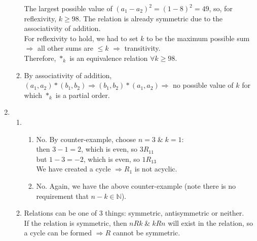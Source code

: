 \documentclass[a4paper, 12pt]{article}
\begin{document}
\begin{enumerate}
\begin{enumerate}
        \noindent The largest possible value of $(a_1 - a_2)^2 = (1 - 8)^2 = 49$, so, for reflexivity, $k \geq 98$. The relation is already symmetric due to the associativity of addition. \\

        \noindent For reflexivity to hold, we had to set $k$ to be the maximum possible sum $\Rightarrow$ all other sums are $\leq k$ $\Rightarrow$ transitivity. \\

        \noindent Therefore, $*_k$ is an equivalence relation $\forall k \geq 98$. \\

        \item By associativity of addition, $(a_1, a_2) * (b_1,b_2) \Rightarrow (b_1, b_2) * (a_1, a_2) \Rightarrow $ no possible value of $k$ for which $*_k$ is a partial order. \\ 
    \end{enumerate}

    \item \begin{enumerate}
        \item \begin{enumerate}
            \item No. By counter-example, choose $n = 3 \;\&\; k = 1$: \\
                then $3 - 1 = 2$, which is even, so $3R_11$ \\
                but $1 - 3 = -2$, which is even, so $1R_13$ \\
            
            \noindent We have created a cycle $\Rightarrow R_1$ is not acyclic. \\

            \item No. Again, we have the above counter-example (note there is no requirement that $n-k \in \mathbb{N}$). \\
        \end{enumerate}
        
        \item Relations can be one of 3 things: symmetric, antisymmetric or neither. \\
        
        \noindent If the relation is symmetric, then $nRk \;\&\; kRn$ will exist in the relation, so a cycle can be formed $\Rightarrow R$ cannot be symmetric. \\
        

\end{enumerate}
\end{enumerate}
\end{document}
